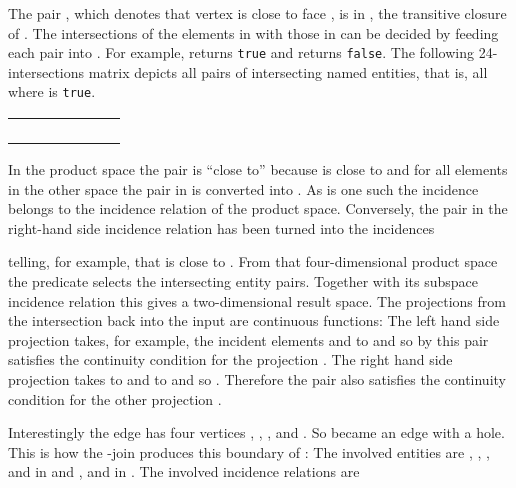 \documentclass[5p]{elsarticle}
\newcommand{\qq}[1]{``#1''}
\begin{document}
The pair , which denotes that vertex  is close to face , is in , the 
transitive closure of . 
The intersections of the elements in  with those in 
 can be decided by feeding each pair into . 
For example,  returns \texttt{true} and  returns \texttt{false}. 
The following 24-intersections matrix depicts all pairs of intersecting named entities,  
that is, all  where  is \texttt{true}. 
\begin{center}
\begin{tabular}{c|cccccc}
   & & & & & & \\\hline
&&&&&&\\
&    &&    &&&\\
&&&&    &    &    \\
&    &&    &    &    &    
\end{tabular}
\end{center}
In the product space the pair  is \qq{close to}  because  is close to  
and for all elements  in the other space the pair  in  is converted into . 
As  is one such  the incidence  belongs to the incidence relation 
of the product space. 
Conversely, the pair  in the right-hand side incidence relation has been turned into 
the incidences 

telling, for example, that  is close to . 
From that four-di\-men\-sio\-nal product space the predicate  selects the intersecting 
entity pairs. Together with its subspace incidence relation this gives a two-dimensional result 
space. 
The projections from the intersection back into the input are continuous functions: 
The left hand side projection takes, for example, the incident elements  and  to  
and so by  this pair satisfies the continuity condition for the 
projection \newline
. 
The right hand side projection takes  to  and  to  and so 
. Therefore the pair also satisfies the continuity 
condition for the other projection 
. 

Interestingly the edge  has four vertices , , , and . So  
became an edge with a hole. This is how the -join produces this boundary of : 
The involved entities are , , , and  in  and , and  in . 
The involved incidence relations are 
\end{document}
